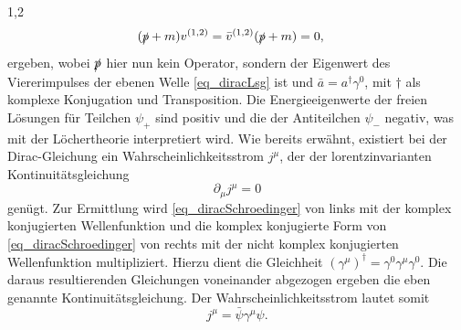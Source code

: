 \documentclass[11pt,a4paper,twoside]{report}
\begin{document}
\begin{spacing}{1,2}
\begin{align}
 (\slashed{p} + m )v^{(1,2)} &= \bar v^{(1,2)}(\slashed{p}+m) = 0,
\end{align}
ergeben, wobei $\slashed{p}$ hier nun kein Operator, sondern der Eigenwert des Viererimpulses der ebenen Welle \eqref{eq_diracLsg} ist und $\bar a = a^\dagger \gamma^0$,
 mit $\dagger$ als komplexe Konjugation und Transposition. %
Die Energieeigenwerte der freien Lösungen für Teilchen $\psi_+$ sind positiv und die der Antiteilchen $\psi_-$ negativ, was mit der Löchertheorie interpretiert
wird. Wie bereits erwähnt, existiert bei der Dirac-Gleichung ein Wahrscheinlichkeitsstrom $j^\mu$, der der lorentzinvarianten Kontinuitätsgleichung
\begin{equation}
 \partial_\mu j^\mu = 0
\end{equation}
genügt. Zur Ermittlung wird \eqref{eq_diracSchroedinger} von links mit der komplex konjugierten Wellenfunktion und die komplex konjugierte
Form von \eqref{eq_diracSchroedinger} von rechts mit der nicht komplex konjugierten Wellenfunktion multipliziert. Hierzu dient die Gleichheit 
$(\gamma^\mu)^\dagger = \gamma^0\gamma^\mu\gamma^0$. Die daraus resultierenden Gleichungen voneinander abgezogen ergeben die eben genannte Kontinuitätsgleichung.
Der Wahrscheinlichkeitsstrom lautet somit
\begin{equation}
 j^\mu = \bar \psi \gamma^\mu \psi.
 \label{eq_diracstrom}
\end{equation}



\end{spacing}
\end{document}
